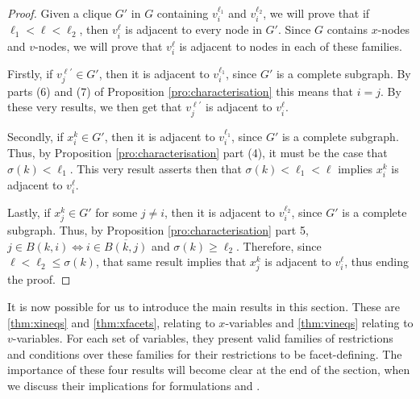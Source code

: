 \begin{proof}
    Given a clique $G'$ in $G$ containing $v_i^{\ell_1}$ and $v_i^{\ell_2}$, we
    will prove that if $\ell_1 < \ell < \ell_2$, then $v_i^\ell$ is adjacent to
    every node in $G'$. Since $G$ contains $x$-nodes and $v$-nodes, we will
    prove that $v_i^\ell$ is adjacent to nodes in each of these families.

    Firstly, if $v_j^{\ell'} \in G'$, then it is adjacent to $v_i^{\ell_1}$,
    since $G'$ is a complete subgraph. By parts (6) and (7) of Proposition
    \ref{pro:characterisation} this means that $i = j$. By these very results,
    we then get that $v_j^{\ell'}$ is adjacent
    to $v_i^\ell$.

    Secondly, if $x_i^k \in G'$, then it is adjacent to $v_i^{\ell_1}$, since
    $G'$ is a complete subgraph. Thus, by Proposition \ref{pro:characterisation}
    part (4), it must be the case that $\sigma(k) < \ell_1$. This very result
    asserts then that $\sigma(k) < \ell_1 < \ell$ implies $x_i^k$ is adjacent to
    $v_i^\ell$.

    Lastly, if $x_j^k \in G'$ for some $j \neq i$, then it is adjacent to
    $v_i^{\ell_2}$, since $G'$ is a complete subgraph. Thus, by Proposition
    \ref{pro:characterisation} part 5, $j \in B(k, i) \iff i \in \overline{B(k,
    j)}$ and $\sigma(k) \geq \ell_2$. Therefore, since $\ell < \ell_2 \leq
    \sigma(k)$, that same result implies that $x_j^k$ is adjacent to $v_i^\ell$,
    thus ending the proof.
\end{proof}

It is now possible for us to introduce the main results in this section. These
are \ref{thm:xineqs} and \ref{thm:xfacets}, relating to $x$-variables and
\ref{thm:vineqs} relating to $v$-variables. For each set of variables, they
present valid families of restrictions and conditions over these families for
their restrictions to be facet-defining. The importance of these four results
will become clear at the end of the section, when we discuss their implications
for formulations \slla and \sllb.

